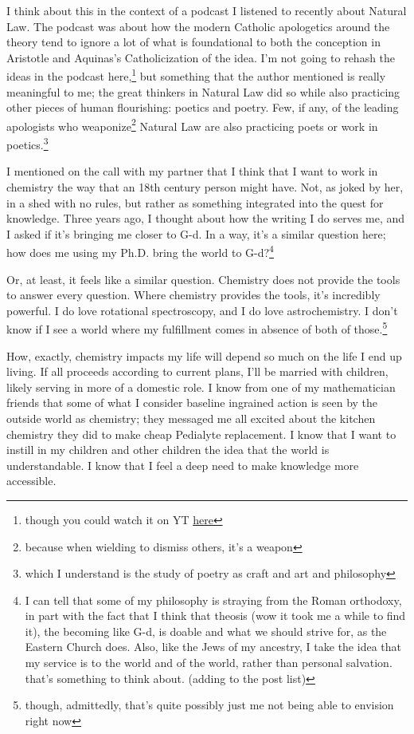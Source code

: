 \documentclass[12pt]{article}
\renewcommand{\,}{\textsuperscript{,}}
\begin{document}
I think about this in the context of a podcast I listened to recently about Natural Law.  
The podcast was about how the modern Catholic apologetics around the theory tend to ignore a lot of what is foundational to both the conception in Aristotle and Aquinas's Catholicization of the idea.  
I'm not going to rehash the ideas in the podcast here,\footnote{though you could watch it on YT \href{https://www.youtube.com/watch?v=apF41LTl6Lw}{here}} but something that the author mentioned is really meaningful to me; the great thinkers in Natural Law did so while also practicing other pieces of human flourishing: poetics and poetry.  
Few, if any, of the leading apologists who weaponize\footnote{because when wielding to dismiss others, it's a weapon} Natural Law are also practicing poets or work in poetics.\footnote{which I understand is the study of poetry as craft and art and philosophy}

I mentioned on the call with my partner that I think that I want to work in chemistry the way that an 18th century person might have.  
Not, as joked by her, in a shed with no rules, but rather as something integrated into the quest for knowledge.  
Three years ago, I thought about how the writing I do serves me, and I asked if it's bringing me closer to G-d.  
In a way, it's a similar question here; how does me using my Ph.D. bring the world to G-d?\footnote{I can tell that some of my philosophy is straying from the Roman orthodoxy, in part with the fact that I think that theosis (wow it took me a while to find it), the becoming like G-d, is doable and what we should strive for, as the Eastern Church does. Also, like the Jews of my ancestry, I take the idea that my service is to the world and of the world, rather than personal salvation. that's something to think about. (adding to the post list)}

Or, at least, it feels like a similar question.  
Chemistry does not provide the tools to answer every question.  
Where chemistry provides the tools, it's incredibly powerful.  
I do love rotational spectroscopy, and I do love astrochemistry.  
I don't know if I see a world where my fulfillment comes in absence of both of those.\footnote{though, admittedly, that's quite possibly just me not being able to envision right now}

How, exactly, chemistry impacts my life will depend so much on the life I end up living.  
If all proceeds according to current plans, I'll be married with children, likely serving in more of a domestic role.  
I know from one of my mathematician friends that some of what I consider baseline ingrained action is seen by the outside world as chemistry; they messaged me all excited about the kitchen chemistry they did to make cheap Pedialyte replacement.  
I know that I want to instill in my children and other children the idea that the world is understandable.  
I know that I feel a deep need to make knowledge more accessible.
\end{document}
